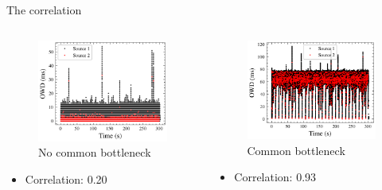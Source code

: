 \documentclass[presentation]{beamer}
\begin{document}
\begin{frame}[label={sec:orga6d0eeb}]{The correlation}
\begin{columns}
\begin{column}{.56\columnwidth}
\begin{figure}[htbp]
\centering
\includegraphics[width=.9\linewidth]{figures/presentation/owd-time-nocommon.png}
\caption{\label{fig:orgfc19fb7}No common bottleneck}
\end{figure}

\begin{itemize}[<3->]
\item Correlation: 0.20
\end{itemize}
\end{column}
\begin{column}{.56\columnwidth}
\pause
\begin{figure}[htbp]
\centering
\includegraphics[width=.9\linewidth]{figures/presentation/owd-time-common.png}
\caption{\label{fig:orgf4f8970}Common bottleneck}
\end{figure}

\begin{itemize}[<3->]
\item Correlation: 0.93
\end{itemize}
\end{column}
\end{columns}
\end{frame}
\end{document}
